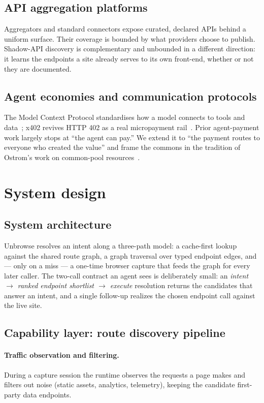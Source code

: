 \documentclass[11pt]{article}
\begin{document}
\subsection{API aggregation platforms}
Aggregators and standard connectors expose curated, declared APIs behind a uniform
surface. Their coverage is bounded by what providers choose to publish. Shadow-API
discovery is complementary and unbounded in a different direction: it learns the
endpoints a site already serves to its own front-end, whether or not they are
documented.

\subsection{Agent economies and communication protocols}
The Model Context Protocol standardises how a model connects to tools and
data~\cite{mcp}; x402 revives HTTP 402 as a real micropayment
rail~\cite{x402}. Prior agent-payment work largely stops at ``the agent can pay.''
We extend it to ``the payment routes to everyone who created the value'' and frame
the commons in the tradition of Ostrom's work on common-pool
resources~\cite{ostrom}.

\section{System design}
\subsection{System architecture}
Unbrowse resolves an intent along a three-path model: a cache-first lookup against
the shared route graph, a graph traversal over typed endpoint edges, and --- only
on a miss --- a one-time browser capture that feeds the graph for every later
caller. The two-call contract an agent sees is deliberately small: an \emph{intent
$\to$ ranked endpoint shortlist $\to$ execute} resolution returns the candidates
that answer an intent, and a single follow-up realizes the chosen endpoint call
against the live site.

\subsection{Capability layer: route discovery pipeline}
\paragraph{Traffic observation and filtering.} During a capture session the runtime
observes the requests a page makes and filters out noise (static assets, analytics,
telemetry), keeping the candidate first-party data endpoints.
\end{document}
